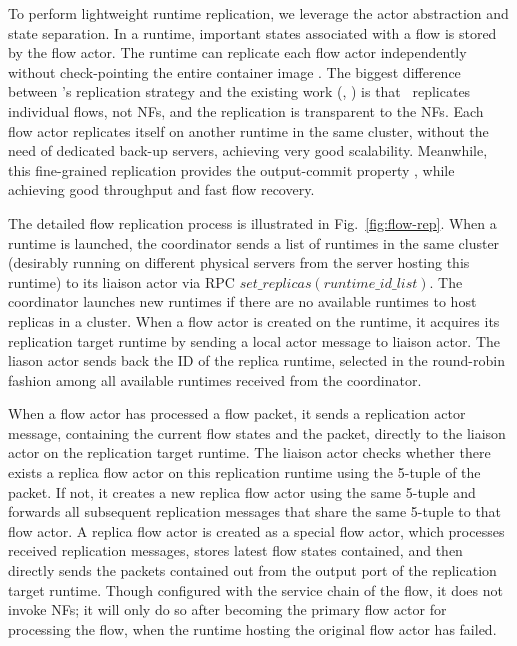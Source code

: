 To perform lightweight runtime replication, we leverage the actor
abstraction and state separation. %
In a runtime, important states associated with a flow is
stored by the flow actor. The runtime can replicate each flow actor
independently without check-pointing the entire
container image \cite{sherry2015rollback, rajagopalan2013pico}.  %
 The biggest difference between \nfactor's replication strategy and the existing work (\eg, \cite{sherry2015rollback}) is that \nfactor~replicates individual flows, not NFs, and the replication is transparent to the NFs. %
Each flow actor replicates itself on another runtime in the same cluster, without the need of dedicated back-up servers, achieving very good scalability.
Meanwhile, this fine-grained replication provides the output-commit property \cite{sherry2015rollback}, while achieving good throughput and fast flow recovery.


The detailed flow replication process is illustrated in Fig.~\ref{fig:flow-rep}. When a runtime is launched, the coordinator sends a list of runtimes in the same cluster (desirably running on different physical servers from the server hosting this runtime) to its liaison actor via RPC $set\_replicas(runtime\_id\_list)$. %
The coordinator launches new runtimes if there are no available runtimes to host replicas in a cluster. When a flow actor is created on the runtime, it acquires its replication target runtime by sending a local actor message to liaison actor. The liason actor sends back the ID of the replica runtime, selected in the round-robin fashion among all available runtimes received from the coordinator. %

When a flow actor has processed a flow packet, it sends a replication actor message, containing the current flow states and the packet, directly to the liaison actor on the replication target runtime. The liaison actor checks whether there exists a replica flow actor on this replication runtime using the 5-tuple of the packet. If not, it creates a new replica flow actor using the same 5-tuple and forwards all subsequent replication messages that share the same 5-tuple to that flow actor. A replica flow actor is created as a special flow actor, which processes received replication messages, stores latest flow states contained, and then directly sends the packets contained out from the output port of the replication target runtime. Though configured with the service chain of the flow, it does not invoke NFs; it will only do so after becoming the primary flow actor for processing the flow, when the runtime hosting the original flow actor has failed.

